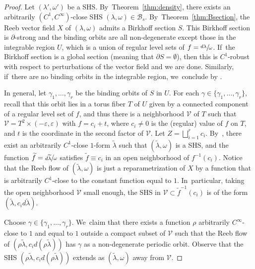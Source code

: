 \documentclass[11pt]{article}
\theoremstyle{definition}
\begin{document}
\begin{proof}
Let $(\lambda',\omega')$ be a SHS. By~Theorem~\ref{thm:density}, there exists an arbitrarily $(C^1,C^\infty)$-close SHS $(\lambda,\omega) \in \mathcal{B}_s$. By~Theorem~\ref{thm:Bsection}, the Reeb vector field $X$ of $(\lambda,\omega)$ admits a Birkhoff section $S$. This Birkhoff section is $\partial$-strong and the binding orbits are all non-degenerate except those in the integrable region $U$, which is a union of regular level sets of $f=\sfrac{d\lambda}{\omega}$. If~the Birkhoff section is a global section (meaning that $\partial S=\emptyset$), then this is $C^1$-robust with respect to perturbations of the vector field and we are done. Similarly, if~there are no binding orbits in the integrable region, we~conclude by \cite[\S 5]{CDHR}.

In general, let $\gamma_1,\dots, \gamma_r$ be the binding orbits of $S$ in $U$. For each $\gamma\in \{\gamma_1,\dots, \gamma_r\}$, recall that this orbit lies in a torus fiber $T$ of $U$ given by a connected component of a regular level set of $f$, and thus there is a neighborhood $\mathcal{V}$ of $T$ such that $\mathcal{V}=T^2\times (-\varepsilon,\varepsilon)$ with $f=c_i+t$, where $c_i\neq 0$ is the (regular) value of $f$ on $T$, and $t$ is the coordinate in the second factor of $\mathcal{V}$. Let $Z=\bigsqcup_{i=1}^r c_i$. By~\cite[Prop.\,3.23]{CV1}, there exist an arbitrarily $C^1$-close $1$-form $\widetilde \lambda$ such that $(\widetilde \lambda, \omega)$ is a SHS, and the function $\widetilde f=\sfrac{d\widetilde \lambda}{\omega}$ satisfies $\widetilde f\equiv c_i$ in an open neighborhood of $f^{-1}(c_i)$. Notice that the Reeb flow of $(\widetilde \lambda, \omega)$ is just a reparametrization of $X$ by a function that is arbitrarily $C^1$-close to the constant function equal to $1$. In~particular, taking the open neighborhood $\mathcal{V}$ small enough, the SHS in $\mathcal{V}\subset \widetilde f^{-1}(c_i)$ is of the form $(\widetilde \lambda, c_i d\widetilde \lambda)$.\enlargethispage{.5\baselineskip}%

Choose $\gamma \in \{\gamma_1,\ldots, \gamma_r\}$. We~claim that there exists a function $\rho$ arbitrarily $C^\infty$\nobreakdash-close to $1$ and equal to $1$ outside a compact subset of $\mathcal V$ such that the Reeb flow of $(\rho\widetilde \lambda, c_i d (\rho \widetilde \lambda))$ has $\gamma$ as a non-degenerate periodic orbit. Observe that the SHS $(\rho\widetilde \lambda, c_i d (\rho \widetilde \lambda))$ extends as $(\widetilde \lambda, \omega)$ away from $\mathcal V$.


\end{proof}
\end{document}
